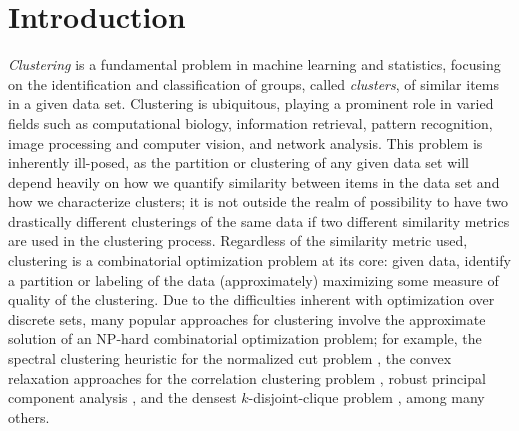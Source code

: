 \documentclass[twoside,11pt]{article}
\newcommand{\0}{\bs{0}}
\begin{document}
\allowdisplaybreaks

\section{Introduction} \label{intro}
\emph{Clustering} is a fundamental problem in machine learning and statistics, focusing on the identification and classification
of groups, called \emph{clusters}, of similar items in a given data set. Clustering is ubiquitous, playing a prominent role
in varied fields such as computational biology, information retrieval, pattern recognition, image processing and computer vision,
and network analysis.
This problem is inherently ill-posed, as the partition or clustering of any given data set will depend heavily on how we
quantify similarity between items in the data set and how we characterize clusters; it is not outside the realm of possibility to
have two drastically different clusterings of the same data if two different similarity metrics are used in the clustering process.
Regardless of the similarity metric used, clustering is a combinatorial optimization 
problem at its core: given data, identify a partition or labeling of the data (approximately) maximizing some
measure of quality of the clustering.
%
Due to the difficulties inherent with optimization over discrete sets, many popular approaches for clustering involve
the approximate solution of an NP-hard combinatorial optimization problem; for example, the spectral clustering heuristic
for the normalized cut problem \citep{dhillon2004kernel, ng2002spectral}, the convex relaxation 
approaches for the correlation clustering problem \citep{mathieu2010correlation},
robust principal component analysis \citep{chen2014clustering, oymak2011finding},
and the densest $k$-disjoint-clique problem \citep{ames2014convex, ames2014guaranteed}, among many others. 
\end{document}
